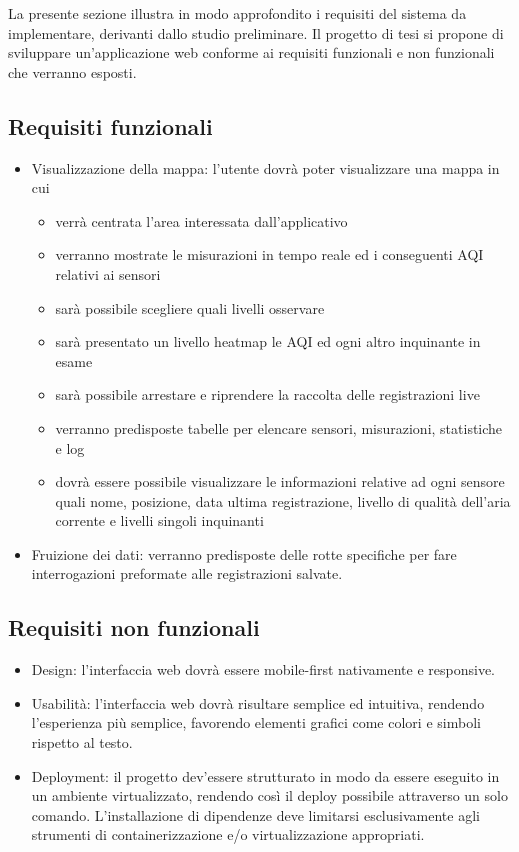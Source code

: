 La presente sezione illustra in modo approfondito i requisiti del sistema da implementare, derivanti dallo studio preliminare.
Il progetto di tesi si propone di sviluppare un'applicazione web conforme ai requisiti funzionali e non funzionali che verranno esposti.

\subsection{Requisiti funzionali}

\begin{itemize}
    \item Visualizzazione della mappa: l'utente dovrà poter visualizzare una mappa in cui
    \begin{itemize}
        \item verrà centrata l'area interessata dall'applicativo
        \item verranno mostrate le misurazioni in tempo reale ed i conseguenti AQI relativi ai sensori
        \item sarà possibile scegliere quali livelli osservare
        \item sarà presentato un livello heatmap le AQI ed ogni altro inquinante in esame
        \item sarà possibile arrestare e riprendere la raccolta delle registrazioni live
        \item verranno predisposte tabelle per elencare sensori, misurazioni, statistiche e log
        \item dovrà essere possibile visualizzare le informazioni relative ad ogni sensore quali nome, posizione, data ultima registrazione, livello di qualità dell'aria corrente e livelli singoli inquinanti
    \end{itemize}
    \item Fruizione dei dati: verranno predisposte delle rotte specifiche per fare interrogazioni preformate alle registrazioni salvate.
\end{itemize}

\subsection{Requisiti non funzionali}

\begin{itemize}
    \item Design: l'interfaccia web dovrà essere mobile-first nativamente e responsive.
    \item Usabilità: l'interfaccia web dovrà risultare semplice ed intuitiva, rendendo l'esperienza più semplice, favorendo elementi grafici come colori e simboli rispetto al testo.
    \item Deployment: il progetto dev'essere strutturato in modo da essere eseguito in un ambiente virtualizzato, rendendo così il deploy possibile attraverso un solo comando. L'installazione di dipendenze deve limitarsi esclusivamente agli strumenti di containerizzazione e/o virtualizzazione appropriati.
\end{itemize}

